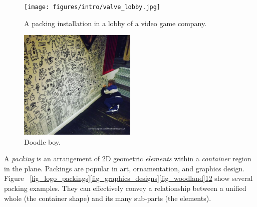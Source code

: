 \begin{figure}
\centering
\texttt{[image: figures/intro/valve\_lobby.jpg]} 
\caption{\label{fig_valve_lobby} 
A packing installation in a lobby of a video game company. }
\end{figure}

\begin{figure}
\centering
\includegraphics[width=0.5\textwidth]{figures/intro/doodle_boy.pdf} 
\caption{\label{fig_doodle_boy} 
Doodle boy. }
\end{figure}




A \textit{packing} is an arrangement of 2D geometric
\textit{elements} within a \textit{container} region in the plane.
Packings are popular in art, ornamentation, and graphics design.
Figure ~\ref{fig_logo_packings}\ref{fig_graphics_designs}\ref{fig_woodland}\ref{fig_valve_lobby}\ref{fig_doodle_boy} show several packing examples.
They can effectively convey a relationship between a unified whole (the
container shape) and its many sub-parts (the elements).



